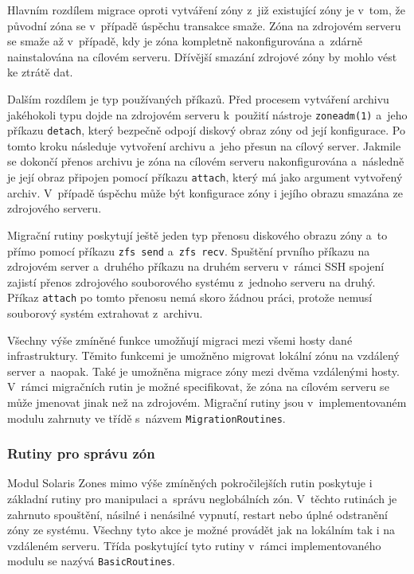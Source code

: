 Hlavním rozdílem migrace oproti vytváření zóny z~již existující zóny je v~tom, že původní zóna se v~případě úspěchu transakce smaže.
Zóna na zdrojovém serveru se smaže až v~případě, kdy je zóna kompletně nakonfigurována a~zdárně nainstalována na
cílovém serveru. Dřívější smazání zdrojové zóny by mohlo vést ke ztrátě dat.

Dalším rozdílem je typ používaných příkazů. Před procesem vytváření archivu jakéhokoli typu dojde na zdrojovém serveru
k~použití nástroje \verb|zoneadm(1)| a~jeho příkazu \verb|detach|, který bezpečně odpojí diskový obraz zóny od její konfigurace.
Po tomto kroku následuje vytvoření archivu a~jeho přesun na cílový server. Jakmile se dokončí přenos archivu je zóna na cílovém
serveru nakonfigurována a~následně je její obraz připojen pomocí příkazu \verb|attach|, který má jako argument vytvořený archiv.
V~případě úspěchu může být konfigurace zóny i jejího obrazu smazána ze zdrojového serveru.

Migrační rutiny poskytují ještě jeden typ přenosu diskového obrazu zóny a~to přímo pomocí příkazu \verb|zfs send|
a~\verb|zfs recv|. Spuštění prvního příkazu na zdrojovém server a~druhého příkazu na druhém serveru v~rámci SSH spojení
zajistí přenos zdrojového souborového systému z~jednoho serveru na druhý. Příkaz \verb|attach| po tomto přenosu nemá skoro žádnou práci,
protože nemusí souborový systém extrahovat z~archivu.

Všechny výše zmíněné funkce umožňují migraci mezi všemi hosty dané infrastruktury. Těmito funkcemi je umožněno migrovat 
lokální zónu na vzdálený server a~naopak. Také je umožněna migrace zóny mezi dvěma vzdálenými hosty. V~rámci migračních rutin je
možné specifikovat, že zóna na cílovém serveru se může jmenovat jinak než na zdrojovém. Migrační rutiny jsou v~implementovaném modulu zahrnuty
ve třídě s~názvem \verb|MigrationRoutines|.
\subsubsection{Rutiny pro správu zón}
\label{chapter:implementation:szones:routines:management}
Modul Solaris Zones mimo výše zmíněných pokročilejších rutin poskytuje i základní rutiny pro manipulaci a~správu 
neglobálních zón. V~těchto rutinách je zahrnuto spouštění, násilné i nenásilné vypnutí, restart nebo úplné odstranění zóny
ze systému. Všechny tyto akce je možné provádět jak na lokálním tak i na vzdáleném serveru. Třída poskytující tyto
rutiny v~rámci implementovaného modulu se nazývá \verb|BasicRoutines|.
